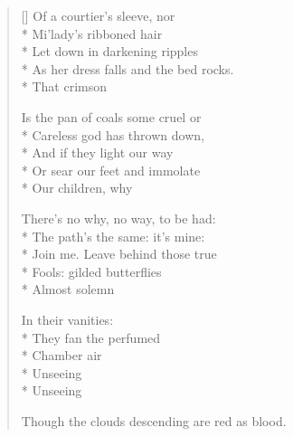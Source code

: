 \begin{verse}[\versewidth]
Of a courtier's sleeve, nor\\*
Mi'lady's ribboned hair\\*
Let down in darkening ripples\\*
As her dress falls and the bed rocks.\\*
That crimson

Is the pan of coals some cruel or\\*
Careless god has thrown down,\\*
And if they light our way\\*
Or sear our feet and immolate\\*
Our children, why

There's no why, no way, to be had:\\*
The path's the same: it's mine:\\*
Join me.  Leave behind those true\\*
Fools: gilded butterflies\\*
Almost solemn

In their vanities:\\*
They fan the perfumed\\*
Chamber air\\*
Unseeing\\*
Unseeing

Though the clouds descending are red as blood.
\end{verse}
